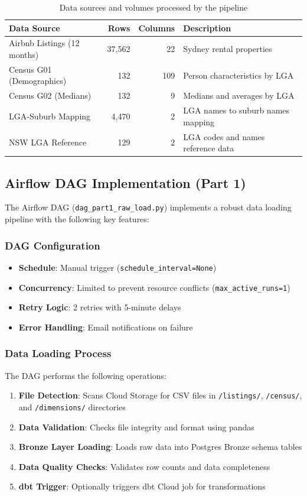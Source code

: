 \begin{table}[H]
  \centering
  \caption{Data sources and volumes processed by the pipeline}
  \label{tab:data-sources}
  \begin{tabularx}{\textwidth}{l r r l}
    \hline
    \textbf{Data Source} & \textbf{Rows} & \textbf{Columns} & \textbf{Description} \\
    \hline
    Airbnb Listings (12 months) & 37,562 & 22 & Sydney rental properties \\
    Census G01 (Demographics) & 132 & 109 & Person characteristics by LGA \\
    Census G02 (Medians) & 132 & 9 & Medians and averages by LGA \\
    LGA-Suburb Mapping & 4,470 & 2 & LGA names to suburb names mapping \\
    NSW LGA Reference & 129 & 2 & LGA codes and names reference data \\
    \hline
  \end{tabularx}
\end{table}

\subsection{Airflow DAG Implementation (Part 1)}
The Airflow DAG (\texttt{dag\_part1\_raw\_load.py}) implements a robust data loading pipeline with the following key features:

\subsubsection{DAG Configuration}
\begin{itemize}
  \item \textbf{Schedule}: Manual trigger (\texttt{schedule\_interval=None})
  \item \textbf{Concurrency}: Limited to prevent resource conflicts (\texttt{max\_active\_runs=1})
  \item \textbf{Retry Logic}: 2 retries with 5-minute delays
  \item \textbf{Error Handling}: Email notifications on failure
\end{itemize}

\subsubsection{Data Loading Process}
The DAG performs the following operations:
\begin{enumerate}
  \item \textbf{File Detection}: Scans Cloud Storage for CSV files in \texttt{/listings/}, \texttt{/census/}, and \texttt{/dimensions/} directories
  \item \textbf{Data Validation}: Checks file integrity and format using pandas
  \item \textbf{Bronze Layer Loading}: Loads raw data into Postgres Bronze schema tables
  \item \textbf{Data Quality Checks}: Validates row counts and data completeness
  \item \textbf{dbt Trigger}: Optionally triggers dbt Cloud job for transformations
\end{enumerate}

